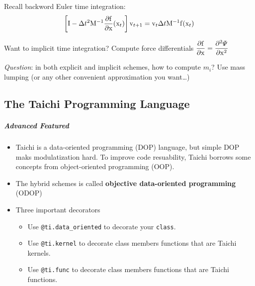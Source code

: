 \documentclass[11pt]{article}
\providecommand{\tightlist}{%
      \setlength{\itemsep}{0pt}\setlength{\parskip}{0pt}}
\begin{document}
Recall backword Euler time integration: \begin{equation*}
    \left[ {\rm I}-\Delta t^{2}{\rm M^{-1}}\displaystyle\frac{\partial{\rm f}}{\partial{\rm x}}({\rm x}_ {t})\right]{\rm v}_ {t+1}={\rm v}_ {t}\Delta t{\rm M^{-1}f}({\rm x}_{t})
\end{equation*}

Want to implicit time integration? Compute force differentials
\(\displaystyle\frac{\partial{\rm f}}{\partial {\rm x}}=\displaystyle\frac{\partial^{2}\varPsi}{\partial{\rm x}^{2}}\)

\emph{Question}: in both explicit and implicit schemes, how to compute
\(m_{i}\)? Use mass lumping (or any other convenient approximation you
want\ldots)

    \hypertarget{the-taichi-programming-language}{%
\subsection{The Taichi Programming
Language}\label{the-taichi-programming-language}}

\hypertarget{advanced-featured}{%
\subparagraph{Advanced Featured}\label{advanced-featured}}

\begin{itemize}
\tightlist
\item
  Taichi is a data-oriented programming (DOP) language, but simple DOP
  maks modulatization hard. To improve code resuability, Taichi borrows
  some concepts from object-oriented programming (OOP).
\item
  The hybrid schemes is called \textbf{objective data-oriented
  programming} (ODOP)
\item
  Three important decorators

  \begin{itemize}
  \tightlist
  \item
    Use \texttt{@ti.data\_oriented} to decorate your \texttt{class}.
  \item
    Use \texttt{@ti.kernel} to decorate class members functions that are
    Taichi kernels.
  \item
    Use \texttt{@ti.func} to decorate class members functions that are
    Taichi functions.
  \end{itemize}
\end{itemize}
\end{document}
